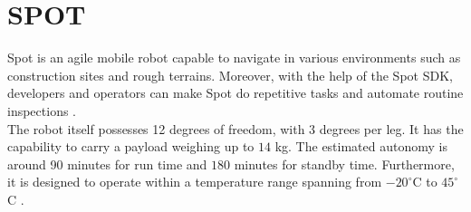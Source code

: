 \section{SPOT}
Spot is an agile mobile robot capable to navigate in various environments such as construction sites and rough terrains. Moreover, with the help of the Spot SDK, developers and operators can make Spot do repetitive tasks and automate routine inspections \cite{Spot}.\\

The robot itself possesses 12 degrees of freedom, with 3 degrees per leg. It has the capability to carry a payload weighing up to $14$ kg. The estimated autonomy is around 90 minutes for run time and $180$ minutes for standby time. Furthermore, it is designed to operate within a temperature range spanning from $-20^{\circ}$C to $45^{\circ}$C \cite{Spotcharact}.
